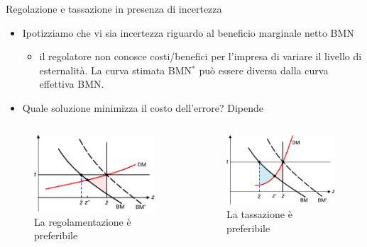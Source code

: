 \documentclass[aspectratio=64,11pt]{beamer}
\begin{document}
\begin{frame}{Regolazione e tassazione in presenza di incertezza}
\begin{itemize}
\item Ipotizziamo che vi sia incertezza riguardo al beneficio marginale netto BMN
\begin{itemize}
\item il regolatore non conosce costi/benefici per l'impresa di variare il
livello di esternalità. La curva stimata BMN$^*$ può essere diversa dalla
curva effettiva BMN.
\end{itemize}
\item Quale soluzione minimizza il costo dell'errore? Dipende
\end{itemize}
\begin{columns}
\begin{column}{.5\columnwidth}
\begin{figure}
\centering
\includegraphics[width=\textwidth]{./figure/esternalita-6-color.pdf}
La regolamentazione è preferibile
\end{figure}
\end{column}

\begin{column}{.5\columnwidth}
\begin{figure}
\centering
\includegraphics[width=\textwidth]{./figure/esternalita-7-color.pdf}
La tassazione è preferibile
\end{figure}
\end{column}
\end{columns}
\end{frame}
\end{document}
